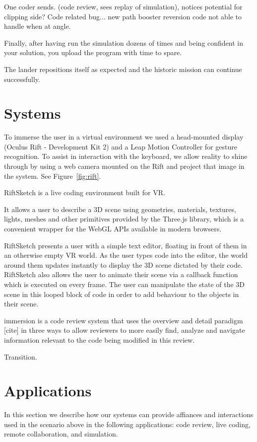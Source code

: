 \documentclass[conference]{IEEEtran}
\begin{document}
One coder sends. (code review, sees replay of simulation), notices potential for clipping side?  Code related bug... new path booster reversion code not able to handle when at angle.

Finally, after having run the simulation dozens of times and being confident in your solution, you upload the program with time to spare. 


The lander repositions itself as expected and the historic mission can continue successfully.
  

\section{Systems}

To immerse the user in a virtual environment we used a head-mounted display (Oculus Rift - Development Kit 2) and a Leap Motion Controller for gesture recognition.
To assist in interaction with the keyboard, we allow reality to shine through by using a web camera mounted on the Rift and project that image in the system.
See Figure~\ref{fig:rift}.

RiftSketch is a live coding environment built for VR.

It allows a user to describe a 3D scene using geometries, materials, textures, lights, meshes and other primitives provided by the Three.js library, which is a convenient wrapper for the WebGL APIs available in modern browsers. 

RiftSketch presents a user with a simple text editor, floating in front of them in an otherwise empty VR world. 
As the user types code into the editor, the world around them updates instantly to display the 3D scene dictated by their code. 
RiftSketch also allows the user to animate their scene via a callback function which is executed on every frame. 
The user can manipulate the state of the 3D scene in this looped block of code in order to add behaviour to the objects in their scene.

immersion is a code review system that uses the overview and detail paradigm [cite] in three ways to allow reviewers to more easily find, analyze and navigate information relevant to the code being modified in this review.

Transition.


\section{Applications}

In this section we describe how our systems can provide affiances and interactions used in the scenario above in the following applications:
code review, live coding, remote collaboration, and simulation. 
\end{document}
